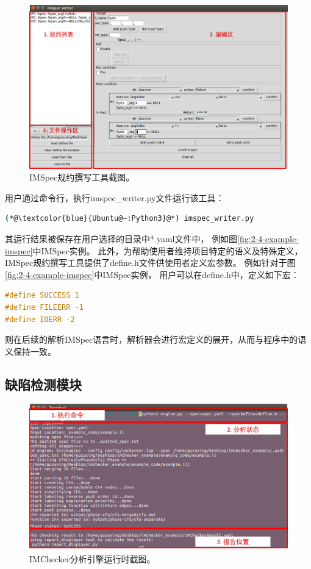 \begin{figure}[t]
	\centering
	\includegraphics[width=0.85\linewidth]{figures/cp4-IMSpec-writer.png}
	\caption{
		IMSpec规约撰写工具截图。
	}
	\label{fig:4-3-IMSpec-writer}
\end{figure}

用户通过命令行，执行imspec\_writer.py文件运行该工具：
\begin{lstlisting}[language={bash},
basicstyle=\linespread{0.8}\listingsfont,
numbers=none,
xleftmargin=.3\textwidth]
(*@\textcolor{blue}{Ubuntu@~:Python3}@*) imspec_writer.py
\end{lstlisting}
其运行结果被保存在用户选择的目录中*.yaml文件中，
例如图\ref{fig:2-4-example-imspec}中IMSpec实例。
此外，为帮助使用者维持项目特定的语义及特殊定义，
IMSpec规约撰写工具提供了define.h文件供使用者定义宏参数。
例如针对于图\ref{fig:2-4-example-imspec}中IMSpec实例，
用户可以在define.h中，定义如下宏：
\begin{lstlisting}[language={C},
basicstyle=\linespread{0.8}\listingsfont,
numbers=none,
xleftmargin=.3\textwidth]
#define SUCCESS 1
#define FILEERR -1
#define IOERR -2
\end{lstlisting}
则在后续的解析IMSpec语言时，解析器会进行宏定义的展开，从而与程序中的语义保持一致。




\subsection{缺陷检测模块}
\begin{figure}[b]
	\centering
	\includegraphics[width=0.85\linewidth]{figures/cp4-IMChecker-engine.png}
	\caption{
		IMChecker分析引擎运行时截图。
	}
	\label{fig:4-3-IMChecker-engine}
\end{figure}

